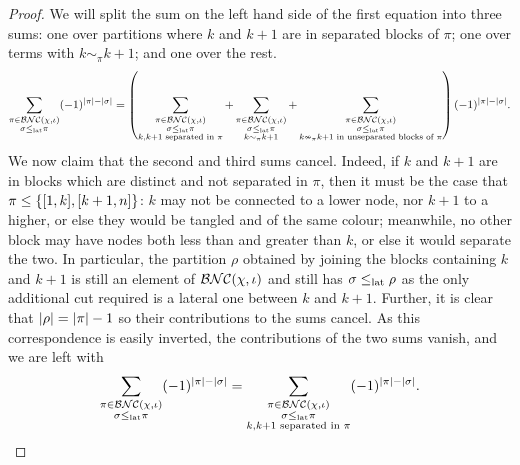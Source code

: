 \begin{proof}
	We will split the sum on the left hand side of the first equation into three sums: one over partitions where $k$ and $k+1$ are in separated blocks of $\pi$; one over terms with $k\sim_\pi k+1$; and one over the rest.
	$$
	\sum_{\substack{\pi\in\mathcal{BNC}(\chi, \iota)\\\sigma\leq_{{\operatorname{lat}}}\pi}} (-1)^{\left|\pi\right| - \left|\sigma\right|}
	= \left(\sum_{\substack{\pi\in\mathcal{BNC}(\chi, \iota)\\\sigma\leq_{{\operatorname{lat}}}\pi \\ k, k+1 \text{ separated in } \pi}}
	+ \sum_{\substack{\pi\in\mathcal{BNC}(\chi, \iota)\\\sigma\leq_{{\operatorname{lat}}}\pi \\ k \sim_\pi k+1}} 
	+ \sum_{\substack{\pi\in\mathcal{BNC}(\chi, \iota)\\\sigma\leq_{{\operatorname{lat}}}\pi \\ k \nsim_\pi k+1 \text{ in unseparated blocks of } \pi}} \right) (-1)^{\left|\pi\right| - \left|\sigma\right|}.
	$$
	We now claim that the second and third sums cancel.
	Indeed, if $k$ and $k+1$ are in blocks which are distinct and not separated in $\pi$, then it must be the case that $\pi \leq \left\{[1,k], [k+1, n]\right\}$: $k$ may not be connected to a lower node, nor $k+1$ to a higher, or else they would be tangled and of the same colour; meanwhile, no other block may have nodes both less than and greater than $k$, or else it would separate the two.
	In particular, the partition $\rho$ obtained by joining the blocks containing $k$ and $k+1$ is still an element of $\mathcal{BNC}(\chi, \iota)$ and still has $\sigma\leq_{{\operatorname{lat}}}\rho$ as the only additional cut required is a lateral one between $k$ and $k+1$.
	Further, it is clear that $\left|\rho\right| = \left|\pi\right|-1$ so their contributions to the sums cancel.
	As this correspondence is easily inverted, the contributions of the two sums vanish, and we are left with
	$$
	\sum_{\substack{\pi\in\mathcal{BNC}(\chi, \iota)\\\sigma\leq_{{\operatorname{lat}}}\pi}} (-1)^{\left|\pi\right| - \left|\sigma\right|}
	= \sum_{\substack{\pi\in\mathcal{BNC}(\chi, \iota)\\\sigma\leq_{{\operatorname{lat}}}\pi \\ k, k+1 \text{ separated in } \pi}} (-1)^{\left|\pi\right| - \left|\sigma\right|}.
	$$


\end{proof}
